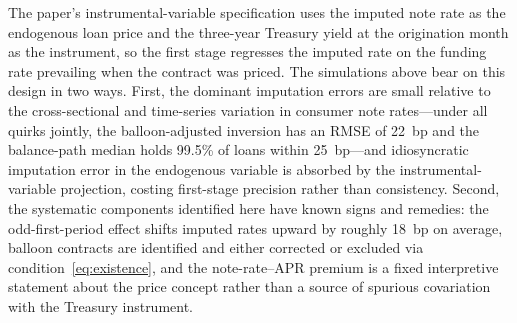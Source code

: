 The paper's instrumental-variable specification uses the imputed note rate as the endogenous loan price and the three-year Treasury yield at the origination month as the instrument, so the first stage regresses the imputed rate on the funding rate prevailing when the contract was priced. The simulations above bear on this design in two ways. First, the dominant imputation errors are small relative to the cross-sectional and time-series variation in consumer note rates---under all quirks jointly, the balloon-adjusted inversion has an RMSE of 22~bp and the balance-path median holds 99.5\% of loans within 25~bp---and idiosyncratic imputation error in the endogenous variable is absorbed by the instrumental-variable projection, costing first-stage precision rather than consistency. Second, the systematic components identified here have known signs and remedies: the odd-first-period effect shifts imputed rates upward by roughly 18~bp on average, balloon contracts are identified and either corrected or excluded via condition~\eqref{eq:existence}, and the note-rate--APR premium is a fixed interpretive statement about the price concept rather than a source of spurious covariation with the Treasury instrument.

